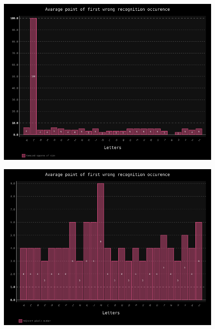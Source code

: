 \documentclass[a4paper]{article}
\begin{document}
\begin{figure}[h!]
	\centering
	\includegraphics[scale=0.7,keepaspectratio=true]{Charts/SquaresTestPlanResultsChart_ClasifierTester.png}	
	\caption{}
	\label{squares_clas}
\end{figure}

\begin{figure}[h!]
	\centering
	\includegraphics[scale=0.7,keepaspectratio=true]{Charts/AdjecentTestPlanResultsChart_NormalTester.png}	
	\caption{}
	\label{adjecent_trans}
\end{figure}
\end{document}
